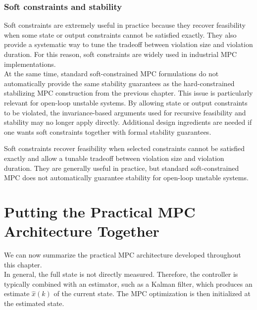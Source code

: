 \subsubsection{Soft constraints and stability}

Soft constraints are extremely useful in practice because they recover feasibility when some state
or output constraints cannot be satisfied exactly. They also provide a systematic way to tune the
tradeoff between violation size and violation duration. For this reason, soft constraints are widely
used in industrial MPC implementations.\\
At the same time, standard soft-constrained MPC formulations do not automatically provide the
same stability guarantees as the hard-constrained stabilizing MPC construction from the previous
chapter. This issue is particularly relevant for open-loop unstable systems. By allowing state or
output constraints to be violated, the invariance-based arguments used for recursive feasibility
and stability may no longer apply directly. Additional design ingredients are needed if one wants
soft constraints together with formal stability guarantees.

\begin{theorembox}
Soft constraints recover feasibility when selected constraints cannot be satisfied exactly and allow
a tunable tradeoff between violation size and violation duration. They are generally useful in
practice, but standard soft-constrained MPC does not automatically guarantee stability for
open-loop unstable systems.
\end{theorembox}

\section{Putting the Practical MPC Architecture Together}

We can now summarize the practical MPC architecture developed throughout this chapter.\\

In general, the full state is not directly measured. Therefore, the controller is typically combined
with an estimator, such as a Kalman filter, which produces an estimate \(\hat x(k)\) of the current
state. The MPC optimization is then initialized at the estimated state.\\

